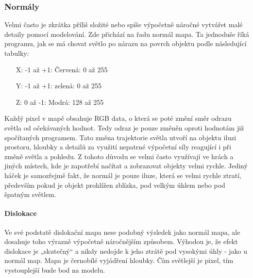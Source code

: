 \documentclass[12pt,a4paper]{report}
\begin{document}
	\subsubsection{Normály}
	Velmi často je zkrátka příliš složité nebo spíše výpočetně náročné vytvářet
	malé detaily pomocí modelování. Zde přichází na řadu normál mapa. Ta
	jednoduše říká programu, jak se má chovat světlo po nárazu na povrch
	objektu podle následující tabulky:
	
	\begin{itemize}
		\item[X:] -1 až +1: Červená: 0 až 255
		\item[Y:] -1 až +1: zelená: 0 až 255
		\item[Z:] 0 až -1: Modrá: 128 až 255
	\end{itemize}
	Každý pixel v mapě obsahuje RGB data, o která se poté změní směr
	odrazu světla od očekávaných hodnot. Tedy odraz je pouze změněn oproti
	hodnotám již spočítaných programem. Tato změna trajektorie světla
	utvoří na objektu iluzi prostoru, hloubky a detailů za využití nepatrné
	výpočetní síly reagující i při změně světla a pohledu. Z tohoto důvodu se
	velmi často využívají ve hrách a jiných místech, kde je zapotřebí načítat
	a zobrazovat objekty velmi rychle. Jediný háček je samozřejmě fakt, že
	normál je pouze iluze, která se velmi rychle ztratí, především pokud je
	objekt prohlížen zblízka, pod velkým úhlem nebo pod špatným světlem.
	
	\paragraph{Dislokace} Ve své podstatě dislokační mapa nese podobný výsledek jako normál
	mapa, ale dosahuje toho výrazně výpočetně náročnějším způsobem.
	Výhodou je, že efekt dislokace je „skutečný“ a nikdy nedojde k jeho ztrátě
	pod vysokými úhly - jako u normál map. Mapa je černobílé vyjádření
	hloubky. Čím světlejší je pixel, tím vystouplejší bude bod na modelu.
	
\end{document}
